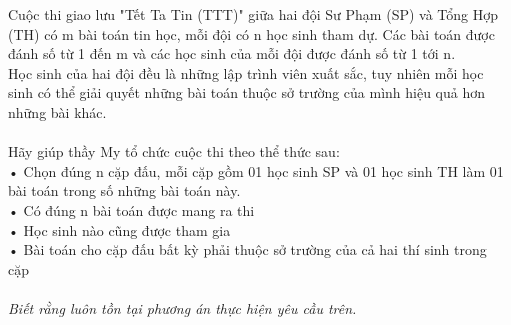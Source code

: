 Cuộc thi giao lưu "Tết Ta Tin (TTT)" giữa hai đội Sư Phạm (SP) và Tổng Hợp (TH) có m bài toán tin học, mỗi đội có n học sinh tham dự. Các bài toán được đánh số từ 1 đến m và các học sinh của mỗi đội được đánh số từ 1 tới n.   
\\   Học sinh của hai đội đều là những lập trình viên xuất sắc, tuy nhiên mỗi học sinh có thể giải quyết những bài toán thuộc sở trường của mình hiệu quả hơn những bài khác.   
\\
\\   Hãy giúp thầy My tổ chức cuộc thi theo thể thức sau:   
\\   • Chọn đúng n cặp đấu, mỗi cặp gồm 01 học sinh SP và 01 học sinh TH làm 01 bài toán trong số những bài toán này.   
\\   • Có đúng n bài toán được mang ra thi   
\\   • Học sinh nào cũng được tham gia   
\\   • Bài toán cho cặp đấu bất kỳ phải thuộc sở trường của cả hai thí sinh trong cặp   
\\
\\\textit{    Biết rằng luôn tồn tại phương án thực hiện yêu cầu trên.   }

\